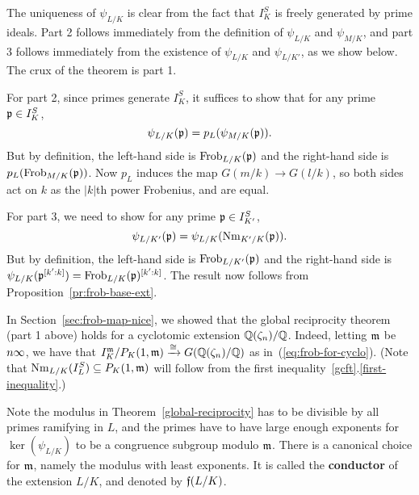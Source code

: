 \begin{rem}
The uniqueness of $\psi_{L/K}$ is clear from the fact that $I_{K}^S$ is freely generated by prime ideals. Part 2 follows immediately from the definition of $\psi_{L/K}$ and $\psi_{M/K}$, and part 3 follows immediately from the existence of $\psi_{L/K}$ and $\psi_{L/K'}$, as we show below. The crux of the theorem is part 1.

For part 2, since primes generate $I_K^S$, it suffices to show that for any prime $\mathfrak{p}\in I_{K}^S$,
\[
\psi_{L/K}(\mathfrak{p})=p_L(\psi_{M/K}(\mathfrak{p})).
\]
But by definition, the left-hand side is $\operatorname{Frob}_{L/K}(\mathfrak{p})$ and the right-hand side is $p_L(\operatorname{Frob}_{M/K}(\mathfrak{p}))$. Now $p_L$ induces the map $G(m/k)\to G(l/k)$, so both sides act on $k$ as the $|k|$th power Frobenius, and are equal.

For part 3, we need to show for any prime $\mathfrak{p}\in I_{K'}^S$,
\[
\psi_{L/K'}(\mathfrak{p})=\psi_{L/K}(\operatorname{Nm}_{K'/K}(\mathfrak{p})).
\]
But by definition, the left-hand side is $\operatorname{Frob}_{L/K'}(\mathfrak{p})$ and the right-hand side is $\psi_{L/K}(\mathfrak{p}^{[k':k]})=\operatorname{Frob}_{L/K}(\mathfrak{p})^{[k':k]}$. The result now follows from Proposition~\ref{pr:frob-base-ext}.
\end{rem}
\begin{ex}
In Section~\ref{sec:frob-map-nice}, we showed that the global reciprocity theorem (part 1 above) holds for a cyclotomic extension $\mathbb{Q}(\zeta_n)/\mathbb{Q}$. Indeed, letting $\mathfrak{m}$ be $n\infty$, we have that $I_K^{\mathfrak{m}}/P_K(1,{\mathfrak{m}})\xrightarrow{\cong}G(\mathbb{Q}(\zeta_n)/\mathbb{Q})$ as in~(\ref{eq:frob-for-cyclo}). (Note that $\operatorname{Nm}_{L/K}(I_L^{S})\subseteq P_K(1,{\mathfrak{m}})$ will follow from the first inequality~\ref{gcft}.\ref{first-inequality}.) 
\end{ex}

Note the modulus in Theorem~\ref{global-reciprocity} has to be divisible by all primes ramifying in $L$, and the primes have to have large enough exponents for $\ker(\psi_{L/K})$ to be a congruence subgroup modulo $\mathfrak{m}$. 
There is a canonical choice for $\mathfrak{m}$, namely the modulus with least exponents. It is called the \textbf{conductor} of the extension $L/K$, and denoted by $\mathfrak{f}(L/K)$.

